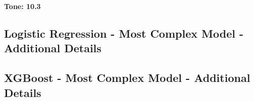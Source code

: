 \documentclass{article}[11pt]
\begin{document}
    \textbf{Tone: 10.3}

    \clearpage
    \newpage
    \subsection{Logistic Regression - Most Complex Model - Additional Details}

    \label{sec:logistic-most-complex-model-additional-details}




    \clearpage
    \newpage

    \subsection{XGBoost - Most Complex Model - Additional Details}

\end{document}

